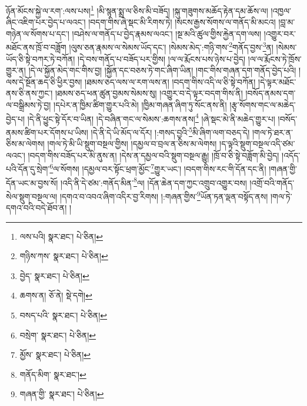 ཉོན་མོངས་སྐྱེ་ལ་རག་:ལས་པས།\footnote{ལས་པའི།  སྣར་ཐང་།  པེ་ཅིན། } །མི་སྙན་སྨྲ་ལ་ཅིས་མི་བཟོད། །སྐུ་གཟུགས་མཆོད་རྟེན་དམ་ཆོས་ལ། །འཁྱལ་ཞིང་འཇིག་པར་བྱེད་པ་ལའང་། །བདག་གིས་ཞེ་སྡང་མི་རིགས་ཏེ། །སངས་རྒྱས་སོགས་ལ་གནོད་མི་མངའ། །བླ་མ་གཉེན་ལ་སོགས་པ་དང་། །བཤེས་ལ་གནོད་པ་བྱེད་རྣམས་ལའང་། །སྔ་མའི་ཚུལ་གྱིས་རྐྱེན་དག་ལས། །འགྱུར་བར་མཐོང་ནས་ཁྲོ་བ་བཟློག །ལུས་ཅན་རྣམས་ལ་སེམས་ཡོད་དང་། །སེམས་མེད་:གཉི་གས་\footnote{གཉིས་ཀས་  སྣར་ཐང་།  པེ་ཅིན། }གནོད་བྱས་\footnote{བྱེད་  སྣར་ཐང་།  པེ་ཅིན། }ན། །སེམས་ཡོད་ཅི་སྟེ་བཀར་ཏེ་བཀོན། །དེ་བས་གནོད་པ་བཟོད་པར་གྱིས། །ལ་ལ་རྨོངས་པས་ཉེས་པ་བྱེད། །ལ་ལ་རྨོངས་ཏེ་ཁྲོས་གྱུར་ན། །དེ་ལ་སྐྱོན་མེད་གང་གིས་བྱ། །སྐྱོན་དང་བཅས་ཏེ་གང་ཞིག་ཡིན། །གང་གིས་གཞན་དག་གནོད་བྱེད་པའི། །ལས་དེ་སྔོན་ཆད་ཅི་ཕྱིར་བྱས། །ཐམས་ཅད་ལས་ལ་རག་ལས་ན། །བདག་གིས་འདི་ལ་ཅི་སྟེ་བཀོན། །དེ་ལྟར་མཐོང་ནས་ཅི་ནས་ཀྱང་། །ཐམས་ཅད་ཕན་ཚུན་བྱམས་སེམས་སུ། །འགྱུར་བ་དེ་ལྟར་བདག་གིས་ནི། །བསོད་ནམས་དག་ལ་བསྒྲིམས་ཏེ་བྱ། །དཔེར་ན་ཁྱིམ་ཚིག་གྱུར་པའི་མེ། །ཁྱིམ་གཞན་ཞིག་ཏུ་སོང་ནས་ནི། །རྩྭ་སོགས་གང་ལ་མཆེད་བྱེད་པ། །དེ་ནི་ཕྱུང་སྟེ་དོར་བ་ཡིན། །དེ་བཞིན་གང་ལ་སེམས་:ཆགས་ནས།\footnote{ཆགས་ན།  ཅོ་ནེ།  སྡེ་དགེ། } །ཞེ་སྡང་མེ་ནི་མཆེད་གྱུར་པ། །བསོད་ནམས་ཚིག་པར་དོགས་པ་ཡིས། །དེ་ནི་དེ་ཡི་མོད་ལ་དོར། །:གསད་བྱའི་\footnote{བསད་པའི་  སྣར་ཐང་།  པེ་ཅིན། }མི་ཞིག་ལག་བཅད་དེ། །གལ་ཏེ་ཐར་ན་ཅིས་མ་ལེགས། །གལ་ཏེ་མི་ཡི་སྡུག་བསྔལ་གྱིས། །དམྱལ་བ་བྲལ་ན་ཅིས་མ་ལེགས། །ད་ལྟའི་སྡུག་བསྔལ་འདི་ཙམ་ལའང་། །བདག་གིས་བཟོད་པར་མི་ནུས་ན། །དེས་ན་དམྱལ་བའི་སྡུག་བསྔལ་རྒྱུ། །ཁྲོ་བ་ཅི་སྟེ་བཟློག་མི་བྱེད། །འདོད་པའི་དོན་དུ་སྲེག་\footnote{བསྲེག་  སྣར་ཐང་།  པེ་ཅིན། }ལ་སོགས། །དམྱལ་བར་སྟོང་ཕྲག་མྱོང་\footnote{མྱོས་  སྣར་ཐང་།  པེ་ཅིན། }གྱུར་ཡང་། །བདག་གིས་རང་གི་དོན་དང་ནི། །གཞན་གྱི་དོན་ཡང་མ་བྱས་སོ། །འདི་ནི་དེ་ཙམ་:གནོད་མིན་\footnote{གནོད་མིག་  སྣར་ཐང་། }ལ། །དོན་ཆེན་དག་ཀྱང་འགྲུབ་འགྱུར་བས། །འགྲོ་བའི་གནོད་སེལ་སྡུག་བསྔལ་ལ། །དགའ་བ་འབའ་ཞིག་འདིར་བྱ་རིགས། །:གཞན་གྱིས་\footnote{གཞན་གྱི་  སྣར་ཐང་།  པེ་ཅིན། }ཡོན་ཏན་ལྡན་བསྟོད་ནས། །གལ་ཏེ་དགའ་བའི་བདེ་ཐོབ་ན། །
